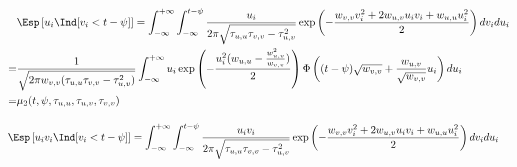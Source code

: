 \documentclass[12pt]{article}
\begin{document}
\begin{align*}
&\Esp\left[u_i\Ind[v_i < t-\psi]\right]
= \int_{-\infty}^{+\infty}\int_{-\infty}^{t-\psi} \frac{u_i}{2\pi\sqrt{\tau_{u,u}\tau_{v,v} - \tau^2_{u,v}}} \exp\left(-\frac{w_{v,v} v_i^2+2 w_{u,v} u_i v_i+w_{u,u}  u_i^2}{2}\right)dv_i du_i \\
=& \frac{1}{\sqrt{2\pi w_{v,v}(\tau_{u,u}\tau_{v,v} - \tau^2_{u,v})}} \int_{-\infty}^{+\infty} u_i \exp\left(-\frac{u_i^2 (w_{u,u} - \frac{w^2_{u,v}}{w_{v,v}})}{2}\right)\Phi\left((t-\psi)\sqrt{w_{v,v}}+\frac{w_{u,v}}{\sqrt{w_{v,v}}}u_i\right) du_i \\ 
=& \mu_2(t,\psi,\tau_{u,u},\tau_{u,v},\tau_{v,v})
\end{align*}

\begin{align*}
&\Esp\left[u_i v_i\Ind[v_i < t-\psi]\right]
= \int_{-\infty}^{+\infty}\int_{-\infty}^{t-\psi} \frac{u_i v_i}{2\pi\sqrt{\tau_{u,u}\tau_{v,v} - \tau^2_{u,v}}} \exp\left(-\frac{w_{v,v} v_i^2+2 w_{u,v} u_i v_i+w_{u,u}  u_i^2}{2}\right)dv_i du_i 
\end{align*}
\end{document}
